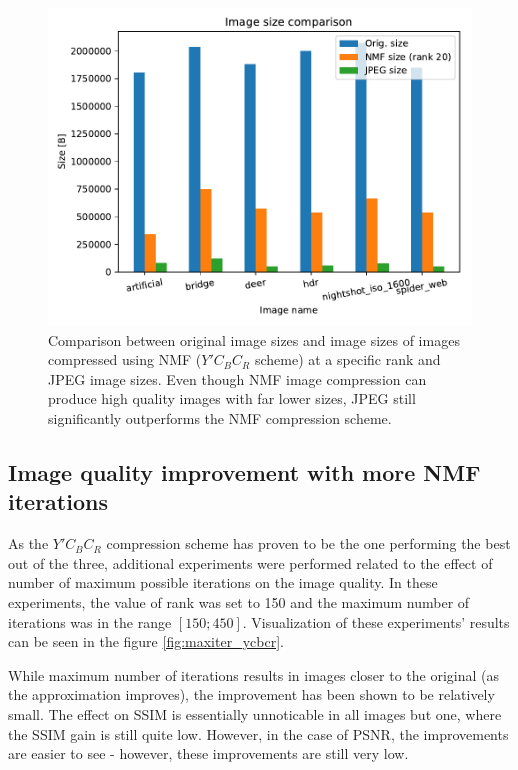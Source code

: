 \documentclass[thesis=M,english]{FITthesis}[2012/10/20]
\begin{document}
\begin{figure}
  \centering
  \includegraphics[scale=0.8]{imgs/results/filesize_comparison}
  \caption[Image size comparison between original, JPEG and $Y'C_BC_R$ compression schemes]{Comparison between original image sizes and image sizes of images compressed using NMF ($Y'C_BC_R$ scheme)
           at a specific rank and JPEG image sizes. Even though NMF image compression can produce
           high quality images with far lower sizes, JPEG still significantly outperforms the NMF
           compression scheme.}
  \label{fig:filesize_comparison}
\end{figure}

\subsection{Image quality improvement with more NMF iterations}
As the $Y'C_BC_R$ compression scheme has proven to be the one performing the best
out of the three, additional experiments were performed related to the effect
of number of maximum possible iterations on the image quality. In these experiments,
the value of rank was set to 150 and the maximum number of iterations was in the range
$[150;450]$. Visualization of these experiments' results can be seen in the figure \ref{fig:maxiter_ycbcr}.

While maximum number of iterations results in images closer to the original (as the
approximation improves), the improvement has been shown to be relatively small. The effect
on SSIM is essentially unnoticable in all images but one, where the SSIM gain is still
quite low. However, in the case of PSNR, the improvements are easier to see - however, these
improvements are still very low.
\end{document}
